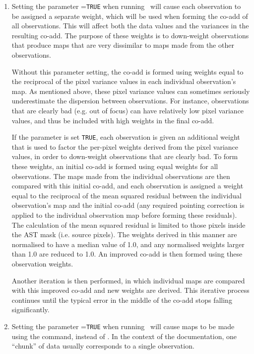 \begin{enumerate}
\item Setting the parameter =\texttt{TRUE} when running
\poltwomap\  will cause each observation to be assigned a separate
weight, which will be used when forming the co-add of all observations.
This will affect both the data values and the variances in the resulting
co-add. The purpose of these weights is to down-weight observations that
produce maps that are very dissimilar to maps made from the other observations.

Without this parameter setting, the co-add is formed using weights equal
to the reciprocal of the pixel variance values in each individual
observation's map. As mentioned above, these pixel variance values can
sometimes seriously underestimate the dispersion between observations.
For instance, observations that are clearly bad (e.g. out of focus) can have
relatively low pixel variance values, and thus be included with high weights
in the final co-add.

If the  parameter is set \texttt{TRUE}, each observation
is given an additional weight that is used to factor the per-pixel
weights derived from the pixel variance values, in order to down-weight
observations that are clearly bad. To form these weights, an initial
co-add is formed using equal weights for all observations. The maps made
from the individual observations are then compared with this initial co-add,
and each observation is assigned a weight equal to the reciprocal of the
mean squared residual between the individual observation's map and the
initial co-add (any required pointing correction is applied to the
individual observation map before forming these residuals). The
calculation of the mean squared residual is limited to those pixels
inside the AST mask (i.e. source pixels). The weights derived in this
manner are normalised to have a median value of 1.0, and any normalised
weights larger than 1.0 are reduced to 1.0. An improved co-add is then
formed using these observation weights.

Another iteration is then performed, in which individual maps are compared
with this improved co-add and new weights are derived. This iterative
process continues until the typical error in the middle of the co-add
stops falling significantly.

\item  Setting the parameter =\texttt{TRUE} when running
\poltwomap\ will cause maps to be made using the
 command, instead of
. In the context of the  documentation, one
``chunk'' of data usually corresponds to a single observation.


\end{enumerate}
